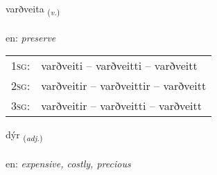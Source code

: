 \documentclass[frontgrid, backgrid]{flacards}\usepackage[]{graphicx}\usepackage[]{color}
\begin{document}
\renewcommand{\flhead}{\vskip5pt \fboxsep=0pt {\small\bfseries\footnotesize Sagnorð | Verb}}
\renewcommand{\fcfoot}{\vskip5pt \fboxsep=0pt \hspace{2pt}{\small\bfseries\footnotesize 2K}}

\renewcommand{\blhead}{\vskip5pt {\small\bfseries\footnotesize Sagnorð | Verb }}
\renewcommand{\bcfoot}{\vskip5pt \hspace{2pt}{\small\bfseries\footnotesize 2K}}


{varðveita \small{\textsubscript{(\textit{v.})}} \\[1ex] %
\textphonetic{[varðveita]} \\
en: \emph{preserve} \\  [2ex]
\renewcommand*{\arraystretch}{0.8}
\begin{tabular}{p{1cm}l}
\textsc{1sg}: & varðveiti -- varðveitti -- varðveitt \\ 
\textsc{2sg}: & varðveitir -- varðveittir -- varðveitt \\ 
\textsc{3sg}: & varðveitir -- varðveitti -- varðveitt \\ 
\end{tabular}
}

\renewcommand{\flhead}{\vskip5pt \fboxsep=0pt {\small\bfseries\footnotesize Lýsingarorð | Adjective}}
\renewcommand{\fcfoot}{\vskip5pt \fboxsep=0pt \hspace{2pt}{\small\bfseries\footnotesize 2K}}

\renewcommand{\blhead}{\vskip5pt {\small\bfseries\footnotesize Lýsingarorð | Adjective }}
\renewcommand{\bcfoot}{\vskip5pt \hspace{2pt}{\small\bfseries\footnotesize 2K}}


{dýr \small{\textsubscript{(\textit{adj.})}} \\[1ex] %
\textphonetic{[tiːr]} \\
en: \emph{expensive, costly, precious} \\  [2ex]
\renewcommand*{\arraystretch}{0.8}
}
\end{document}
